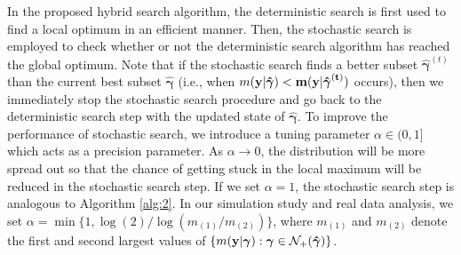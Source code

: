 \documentclass[twocolumn]{svjour3}       %
\newcommand{\uy}{\bf y} %
\newcommand{\0}{\boldsymbol 0} %
\newcommand{\1}{\boldsymbol 1} %
\newcommand{\bg}{\boldsymbol \gamma} %
\begin{document}
In the proposed hybrid search algorithm, the deterministic search is first used to find a local optimum in an efficient manner. Then, the stochastic search is employed to check whether or not the deterministic search algorithm has reached the global optimum. Note that if the stochastic search finds a better subset $\hat{\bg}^{(t)}$ than the current best subset $\hat{\bg}$ (i.e., when $m(\uy|\hat{\bg})<m(\uy|\hat{\bg}^{(t)})$ occurs), then we immediately stop the stochastic search procedure and go back to the deterministic search step with the updated state of $\hat{\bg}$. To improve the performance of stochastic search, we introduce a tuning parameter $\alpha \in (0,1]$ which acts as a precision parameter. As $\alpha\to 0$, the distribution will be more spread out so that the chance of getting stuck in the local maximum will be reduced in the stochastic search step. If we set $\alpha=1$, the stochastic search step is analogous to Algorithm \ref{alg:2}. In our simulation study and real data analysis, we set $\alpha=\min\{1,\log(2)/\log( m_{(1)} /  m_{(2)} )\}$, where $m_{(1)}$ and $m_{(2)}$ denote the first and second largest values of $\{m(\uy|\bg)
: \bg  \in \mathcal{N}_+(\hat{\bg}) \}$. 
\end{document}
